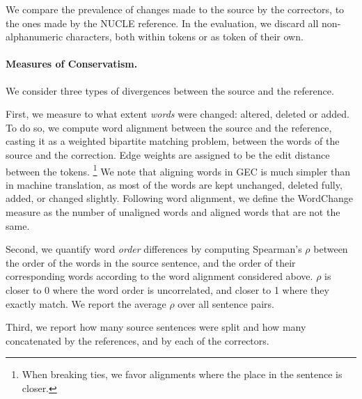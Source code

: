\documentclass[letter,11pt]{article}
\newcommand{\oa}[1]{\footnote{\color{red}OA: #1}}
\begin{document}
We compare the prevalence of changes made to the source by the correctors, to the ones made by the NUCLE reference. In the evaluation, we discard all non-alphanumeric characters, both within tokens or as token of their own.



\paragraph{Measures of Conservatism.}
We consider three types of divergences between the source and the reference.

First, we measure to what extent \emph{words} were changed: altered, deleted or added.
To do so, we compute word alignment between the source and the reference, casting it
as a weighted bipartite matching problem, between the words of the source
and the correction. 
Edge weights are assigned to be the edit distance between the tokens.
\footnote{When breaking ties, we favor alignments where the place in the sentence is closer.}
We note that aligning words in GEC is much simpler than in machine translation,
as most of the words are kept unchanged, deleted fully, added, or changed slightly.
Following word alignment, we define the {\sc WordChange} measure
as the number of unaligned words and aligned words that are not the same.

Second, we quantify word \emph{order} differences by computing
Spearman's $\rho$ between the order of the words in the source sentence,
and the order of their corresponding words according to the word alignment considered above.
$\rho$ is closer to 0 where the word order is uncorrelated, and closer to 1 where they
exactly match. We report the average $\rho$ over all sentence pairs. 

Third, we report how many source sentences were split and how many concatenated by the references,
and by each of the correctors.
\end{document}

